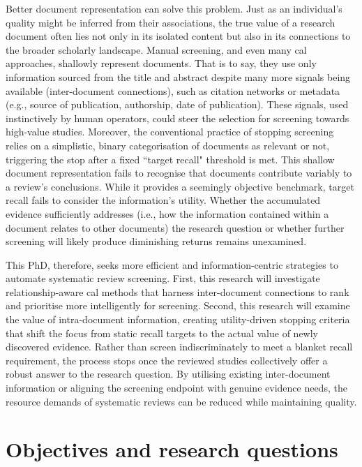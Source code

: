 \documentclass[10pt,oneside]{book}
\begin{document}
Better document representation can solve this problem. Just as an individual's quality might be inferred from their associations, the true value of a research document often lies not only in its isolated content but also in its connections to the broader scholarly landscape. Manual screening, and even many \gls*{cal} approaches, shallowly represent documents. That is to say, they use only information sourced from the title and abstract despite many more signals being available (inter-document connections), such as citation networks or metadata (e.g., source of publication, authorship, date of publication). These signals, used instinctively by human operators, could steer the selection for screening towards high-value studies. Moreover, the conventional practice of stopping screening relies on a simplistic, binary categorisation of documents as relevant or not, triggering the stop after a fixed ``target recall" threshold is met. This shallow document representation fails to recognise that documents contribute variably to a review's conclusions. While it provides a seemingly objective benchmark, target recall fails to consider the information's utility. Whether the accumulated evidence sufficiently addresses (i.e., how the information contained within a document relates to other documents) the research question or whether further screening will likely produce diminishing returns remains unexamined. 

This PhD, therefore, seeks more efficient and information-centric strategies to automate systematic review screening. First, this research will investigate relationship-aware \gls*{cal} methods that harness inter-document connections to rank and prioritise more intelligently for screening. Second, this research will examine the value of intra-document information, creating utility-driven stopping criteria that shift the focus from static recall targets to the actual value of newly discovered evidence. Rather than screen indiscriminately to meet a blanket recall requirement, the process stops once the reviewed studies collectively offer a robust answer to the research question. By utilising existing inter-document information or aligning the screening endpoint with genuine evidence needs, the resource demands of systematic reviews can be reduced while maintaining quality.


\section{Objectives and research questions}
\end{document}
